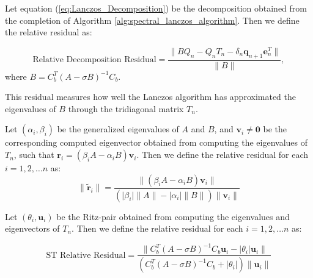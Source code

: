 \begin{definition}\label{def:DecompositionResidual}
	Let equation (\ref{eq:Lanczos_Decomposition}) be the decomposition obtained from the completion of Algorithm \ref{alg:spectral_lanczos_algorithm}. Then we define the relative residual as:
	
	\begin{equation}\label{eq:DecompositionResidual}
		\text{Relative Decomposition Residual} = \frac{\|BQ_n - Q_nT_n - \delta_{n}\mathbf{q}_{n+1}\mathbf{e}_n^T\|}{\|B\|},
	\end{equation}
	where $B = C_b^T (A-\sigma B)^{-1} C_b $.
\end{definition}
This residual measures how well the Lanczos algorithm has approximated the eigenvalues of $B$ through the tridiagonal matrix $T_n$.

\begin{definition}\label{def:GeneralizedRelativeResidual}
	Let $(\alpha_i, \beta_i)$ be the generalized eigenvalues of $A$ and $B$, and $\mathbf{v}_i \neq \mathbf{0}$ be the corresponding computed eigenvector obtained from computing the eigenvalues of $T_n$, such that $\mathbf{r}_i = (\beta_i A - \alpha_i B)\mathbf{v}_i$. Then we define the relative residual for each $i = 1, 2, \ldots n$ as:
	\begin{equation}\label{eq:GeneralizedResidual}
		\|\tilde{\mathbf{r}}_i\| = \frac{\| (\beta_i A - \alpha_i B)\mathbf{v}_i \| }{(\lvert \beta_i \rvert \|A\| - \lvert \alpha_i \rvert \|B\|)\|\mathbf{v}_i\| }
	\end{equation}
\end{definition}

\begin{definition}\label{def:SpectralTransformedResidual}
	Let $(\theta_i, \mathbf{u}_i)$ be the Ritz-pair obtained from computing the eigenvalues and eigenvectors of $T_n$. Then we define the relative residual for each $i = 1, 2, \ldots n$ as:
	
	\begin{equation}\label{eq:STResidual}
		\text{ST Relative Residual} = \frac{\| C_b^T(A - \sigma B)^{-1}C_b \mathbf{u}_i - \lvert \theta_i \rvert \mathbf{u}_i \| }{( C_b^T(A - \sigma B)^{-1}C_b + \lvert \theta_i \rvert)\|\mathbf{u}_i\| }
	\end{equation}
\end{definition}

